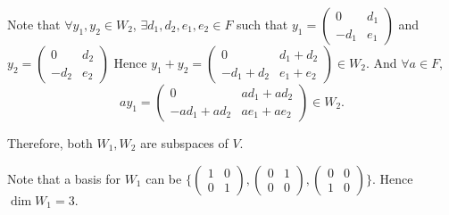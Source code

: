 \documentclass[12pt]{article}%
\begin{document}
Note that $\forall y_1,y_2\in W_2$, $\exists d_1,d_2,e_1,e_2 \in F$ such that $y_1=\begin{pmatrix}
                                                                                        0 & d_1
                                                                                        \\-d_1 & e_1
                                                                                        \end{pmatrix}$ and $y_2=\begin{pmatrix}
                                                                                            0 & d_2
                                                                                            \\-d_2 & e_2
                                                                                            \end{pmatrix}$ Hence $y_1+y_2=\begin{pmatrix}
                                                                                                                            0 & d_1 +d_2
                                                                                                                            \\-d_1+d_2 & e_1+e_2
                                                                                                                            \end{pmatrix} \in W_2.$ And $\forall a \in F,$ $$ay_1=\begin{pmatrix}
                                                                                                                                                                                    0 & ad_1 +ad_2
                                                                                                                                                                                    \\-ad_1+ad_2 & ae_1+ae_2
                                                                                                                                                                                    \end{pmatrix} \in W_2.$$

Therefore, both $W_1, W_2$ are subspaces of $V$. 

Note that a basis for $W_1$ can be $\{ \begin{pmatrix} 1 & 0 \\0 & 1 \end{pmatrix}, \begin{pmatrix} 0 & 1 \\0 & 0 \end{pmatrix}, \begin{pmatrix} 0 & 0 \\1 & 0 \end{pmatrix}  \}$. Hence $\dim{W_1}=3.$
\end{document}
